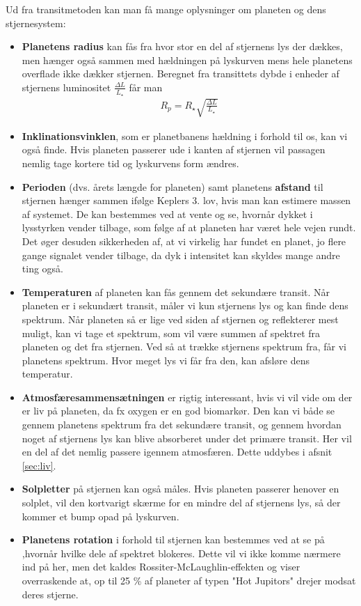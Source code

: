 Ud fra transitmetoden kan man få mange oplysninger om planeten og dens stjernesystem:
\begin{itemize}
    \item \textbf{Planetens radius} kan fås fra hvor stor en del af stjernens lys der dækkes, men hænger også sammen med hældningen på lyskurven mens hele planetens overflade ikke dækker stjernen. Beregnet fra transittets dybde i enheder af stjernens luminositet $\frac{\Delta L}{L_\star }$ får man
    \begin{align}
        R_p = R_\star  \sqrt{\frac{\Delta L}{L_\star }}
    \end{align}
    \item \textbf{Inklinationsvinklen}, som er planetbanens hældning i forhold til os, kan vi også finde. Hvis planeten passerer ude i kanten af stjernen vil passagen nemlig tage kortere tid og lyskurvens form ændres.
    \item \textbf{Perioden} (dvs. årets længde for planeten) samt planetens \textbf{afstand} til stjernen hænger sammen ifølge Keplers 3. lov, hvis man kan estimere massen af systemet. De kan bestemmes ved at vente og se, hvornår dykket i lysstyrken vender tilbage, som følge af at planeten har været hele vejen rundt. Det øger desuden sikkerheden af, at vi virkelig har fundet en planet, jo flere gange signalet vender tilbage, da dyk i intensitet kan skyldes mange andre ting også. %
    \item \textbf{Temperaturen} af planeten kan fås gennem det sekundære transit. Når planeten er i sekundært transit, måler vi kun stjernens lys og kan finde dens spektrum. Når planeten så er lige ved siden af stjernen og reflekterer mest muligt, kan vi tage et spektrum, som vil være summen af spektret fra planeten og det fra stjernen. Ved så at trække stjernens spektrum fra, får vi planetens spektrum. Hvor meget lys vi får fra den, kan afsløre dens temperatur.
    \item \textbf{Atmosfæresammensætningen} er rigtig interessant, hvis vi vil vide om der er liv på planeten, da fx oxygen er en god biomarkør. Den kan vi både se gennem planetens spektrum fra det sekundære transit, og gennem hvordan noget af stjernens lys kan blive absorberet under det primære transit. Her vil en del af det nemlig passere igennem atmosfæren. Dette uddybes i afsnit \ref{sec:liv}.
    \item \textbf{Solpletter} på stjernen kan også måles. Hvis planeten passerer henover en solplet, vil den kortvarigt skærme for en mindre del af stjernens lys, så der kommer et bump opad på lyskurven.
    \item \textbf{Planetens rotation} i forhold til stjernen kan bestemmes ved at se på ,hvornår hvilke dele af spektret blokeres. Dette vil vi ikke komme nærmere ind på her, men det kaldes Rossiter-McLaughlin-effekten og viser overraskende at, op til 25 \% af planeter af typen "Hot Jupitors" drejer modsat deres stjerne. 
    \end{itemize}
    
